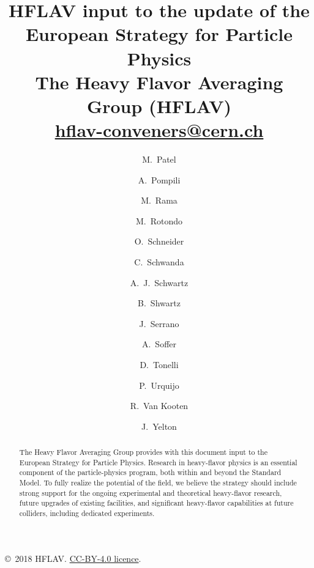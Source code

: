 \documentclass[12pt,a4paper]{article}
\def\paperauthors{The Heavy Flavor Averaging Group (HFLAV)} %
\def\papertitle{HFLAV input to the update of the \\ European Strategy for Particle Physics} %
\def\papercopyright{2018 HFLAV} %
\def\paperlicence{CC-BY-4.0 licence}
\def\paperlicenceurl{https://creativecommons.org/licenses/by/4.0/}
\begin{document}
\author[9]{M.~Patel}
\author[24,25]{A.~Pompili}
\author[26]{M.~Rama}
\author[27]{M.~Rotondo}
\author[23]{O.~Schneider}
\author[28]{C.~Schwanda}
\author[29]{A.~J.~Schwartz}
\author[30,31]{B.~Shwartz}
\author[17]{J.~Serrano}
\author[32]{A.~Soffer}
\author[33]{D.~Tonelli}
\author[34]{P.~Urquijo}
\author[35]{R.~Van Kooten}
\author[36]{J.~Yelton}

\title{\papertitle \\ \large \paperauthors\\
\href{mailto:hflav-conveners@cern.ch}{hflav-conveners@cern.ch}}
\date{}
\maketitle


\begin{abstract}
  \noindent
    The Heavy Flavor Averaging Group provides with this document input to
    the European Strategy for Particle Physics. Research in heavy-flavor physics is an essential component of the particle-physics program, both within and beyond the Standard Model. To fully realize the potential of the field, we believe the strategy should include strong support for
    the ongoing experimental and theoretical heavy-flavor research, future upgrades of existing facilities, and significant heavy-flavor capabilities at future colliders, including dedicated experiments.
\end{abstract}

{\footnotesize 
\centerline{\copyright~\papercopyright. \href{\paperlicenceurl}{\paperlicence}.}}
\vspace*{2mm}
\end{document}
